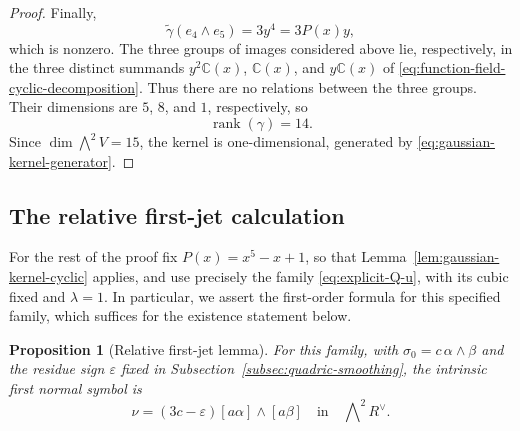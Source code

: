\documentclass[11pt]{article}
\newtheorem{proposition}[theorem]{Proposition}
\begin{document}
\begin{proof}
Finally,
\begin{equation*}
\widetilde\gamma(e_4\wedge e_5)=3y^4=3P(x)y,
\end{equation*}
which is nonzero.  The three groups of images considered above lie,
respectively, in the three distinct summands
$y^2\mathbb C(x)$, $\mathbb C(x)$, and $y\mathbb C(x)$ of
\eqref{eq:function-field-cyclic-decomposition}.  Thus there are no
relations between the three groups.  Their dimensions are $5$, $8$, and
$1$, respectively, so
\begin{equation*}
\operatorname{rank}(\gamma)=14.
\end{equation*}
Since $\dim\bigwedge^2V=15$, the kernel is one-dimensional, generated by \eqref{eq:gaussian-kernel-generator}.
\end{proof}

\subsection{The relative first-jet calculation}
\label{subsec:relative-first-jet}

\begingroup
For the rest of the proof fix $P(x)=x^5-x+1$, so that
Lemma~\ref{lem:gaussian-kernel-cyclic} applies, and use precisely the
family \eqref{eq:explicit-Q-u}, with its cubic fixed and $\lambda=1$.
In particular, we assert the first-order formula for this specified
family, which suffices for the existence statement below.

\begin{proposition}[Relative first-jet lemma]
\label{prop:relative-first-jet}
For this family, with $\sigma_0=c\,\alpha\wedge\beta$ and the residue
sign $\varepsilon$ fixed in Subsection~\ref{subsec:quadric-smoothing},
the intrinsic first normal symbol is
\begin{equation}
\label{eq:relative-first-jet-formula}
\nu=(3c-\varepsilon)[a\alpha]\wedge[a\beta]
\quad\text{in}\quad\bigwedge\nolimits^2R^\vee.
\end{equation}
\end{proposition}
\end{document}
